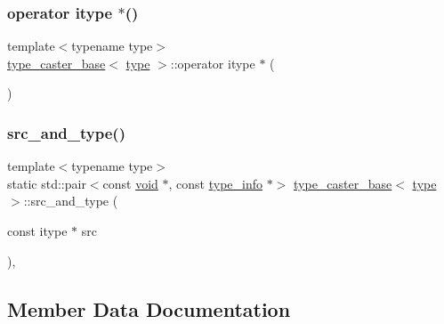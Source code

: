 \subsubsection{\texorpdfstring{operator itype $\ast$()}{operator itype *()}}
{\footnotesize\ttfamily template$<$typename type$>$ \\
\mbox{\hyperlink{classtype__caster__base}{type\+\_\+caster\+\_\+base}}$<$ \mbox{\hyperlink{_s_d_l__opengl_8h_ad5ddf6fca7b585646515660e810e0188}{type}} $>$\+::operator itype $\ast$ (\begin{DoxyParamCaption}{ }\end{DoxyParamCaption})\hspace{0.3cm}{\ttfamily [inline]}}

\mbox{\label{classtype__caster__base_ad5559aeb9ea8d133f3a62ca22b4a1ae5}} 
\subsubsection{\texorpdfstring{src\_and\_type()}{src\_and\_type()}}
{\footnotesize\ttfamily template$<$typename type$>$ \\
static std\+::pair$<$const \mbox{\hyperlink{_s_d_l__opengles2__gl2ext_8h_ae5d8fa23ad07c48bb609509eae494c95}{void}} $\ast$, const \mbox{\hyperlink{structtype__info}{type\+\_\+info}} $\ast$$>$ \mbox{\hyperlink{classtype__caster__base}{type\+\_\+caster\+\_\+base}}$<$ \mbox{\hyperlink{_s_d_l__opengl_8h_ad5ddf6fca7b585646515660e810e0188}{type}} $>$\+::src\+\_\+and\+\_\+type (\begin{DoxyParamCaption}\item[{const itype $\ast$}]{src }\end{DoxyParamCaption})\hspace{0.3cm}{\ttfamily [inline]}, {\ttfamily [static]}}



\subsection{Member Data Documentation}
\mbox{\label{classtype__caster__base_a1287a0b427306b31949df84e062373ba}} 
